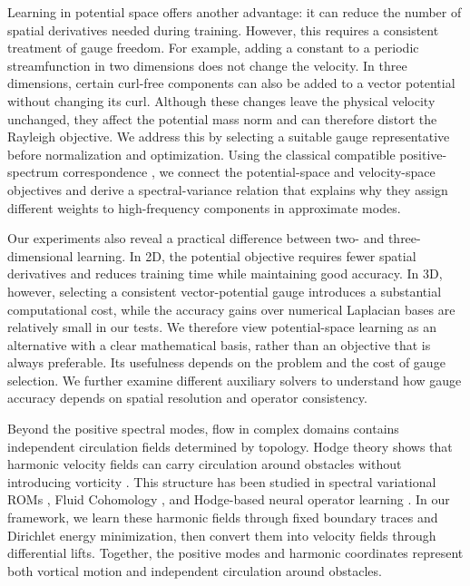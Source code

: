 Learning in potential space offers another advantage: it can reduce the number of spatial derivatives needed during training. However, this requires a consistent treatment of gauge freedom. For example, adding a constant to a periodic streamfunction in two dimensions does not change the velocity. In three dimensions, certain curl-free components can also be added to a vector potential without changing its curl. Although these changes leave the physical velocity unchanged, they affect the potential mass norm and can therefore distort the Rayleigh objective. We address this by selecting a suitable gauge representative before normalization and optimization. Using the classical compatible positive-spectrum correspondence \citep{arnold2006finite}, we connect the potential-space and velocity-space objectives and derive a spectral-variance relation that explains why they assign different weights to high-frequency components in approximate modes.

Our experiments also reveal a practical difference between two- and three-dimensional learning. In 2D, the potential objective requires fewer spatial derivatives and reduces training time while maintaining good accuracy. In 3D, however, selecting a consistent vector-potential gauge introduces a substantial computational cost, while the accuracy gains over numerical Laplacian bases are relatively small in our tests. We therefore view potential-space learning as an alternative with a clear mathematical basis, rather than an objective that is always preferable. Its usefulness depends on the problem and the cost of gauge selection. We further examine different auxiliary solvers to understand how gauge accuracy depends on spatial resolution and operator consistency.

Beyond the positive spectral modes, flow in complex domains contains independent circulation fields determined by topology. Hodge theory shows that harmonic velocity fields can carry circulation around obstacles without introducing vorticity \citep{arnold2006finite}. This structure has been studied in spectral variational ROMs \citep{liu2015model}, Fluid Cohomology \citep{yin2023fluid}, and Hodge-based neural operator learning \citep{zheng2026hodge}. In our framework, we learn these harmonic fields through fixed boundary traces and Dirichlet energy minimization, then convert them into velocity fields through differential lifts. Together, the positive modes and harmonic coordinates represent both vortical motion and independent circulation around obstacles.

